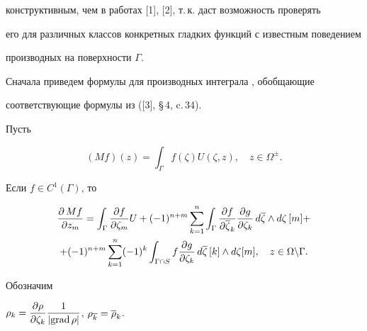 конструктивным, чем в работах [1], [2], т.\,к. даст возможность проверять


его для различных классов конкретных гладких функций с известным поведением


производных на поверхности $\Gamma$.





Сначала  приведем формулы для производных интеграла \bm, обобщающие


соответствующие формулы из ([3], \S\,4, c.\,34).





Пусть


$$


(Mf)(z)=\int_\Gamma f(\zeta)U(\zeta,z),\quad z\in\Omega^\pm.


$$





\begin{lem}


Если $f\in C^1(\Gamma)$, то


\begin{multline*}


\frac{\partial\,Mf}{\partial z_m}


=\ig\Pd{f}{\zt_m} U+(-1)^{n+m}\sm\ig\Pd{f}{\ovl\zt_k}


\Pd{g}{\zt_k}\,d\ovl\zt\ld d\zt\,[m]+\\


+(-1)^{n+m}\sm(-1)^k\igs f\Pd{g}{\zt_k}\,d\ovl\zt\,[k]\ld d\zt[m],


\quad z\in\Omega\backslash\Gamma.


\end{multline*}


\end{lem}





Обозначим


$\rho_{k}=\displaystyle\frac{\partial{\rho}}{\partial{\zeta_k}}\frac1{|\text{grad}\,\rho|}$, $\rho_{\overline{k}}=\overline\rho_k$.





